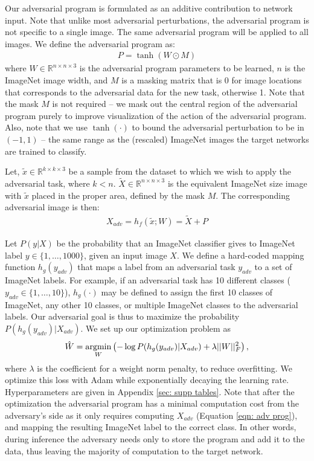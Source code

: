 \documentclass{article}
\newcommand{\argmin}{\operatornamewithlimits{argmin}}
\newcommand{\jcom}[1]{{\textcolor{darkgreen}{[Jascha: #1]}}}
\begin{document}
Our adversarial program is formulated as an additive contribution to network input. 
Note that unlike most adversarial perturbations, the adversarial program is not specific to a single image. 
The same adversarial program will be applied to all images.
We define the adversarial program as:
\begin{align}
P = \tanh\left(W \odot M\right)
\end{align}
where $W \in \mathbb{R}^{n \times n \times 3}$ is the adversarial program parameters to be learned, $n$ is the ImageNet image width, and $M$ is a masking matrix that is 0 for image locations that corresponds to the adversarial data for the new task, otherwise 1. 
Note that the mask $M$ is not required -- we mask out the central region of the adversarial program purely to improve visualization of the action of the adversarial program. 
Also, note that we use $\tanh\left(\cdot\right)$ to bound the adversarial perturbation to be in $(-1, 1)$ -- the same range as the (rescaled) ImageNet images the target networks are trained to classify. 

Let, $\tilde{x} \in \mathbb{R}^{k \times k \times 3}$ be a sample from the dataset to which we wish to apply the adversarial task, where $k < n$. $\tilde{X} \in \mathbb{R}^{n \times n \times 3}$ is the equivalent ImageNet size image with $\tilde{x}$ placed in the proper area, defined by the mask $M$.
The corresponding adversarial image is then:
\begin{align}
X_{adv} = h_f\left(\tilde{x}; W\right) = 
\tilde{X} + P
\label{eqn: adv prog}
\end{align}%

Let $P(y | X)$ be the probability that an ImageNet classifier gives to ImageNet label $y \in \{1, \hdots, 1000\}$, given an input image $X$. We define a hard-coded mapping function $h_g(y_{adv})$ that maps a label from an adversarial task $y_{adv}$ to a set of ImageNet labels. For example, if an adversarial task has 10 different classes ($y_{adv} \in \{1, \hdots, 10\}$), $h_g\left(\cdot\right)$ may be defined to assign the first 10 classes of ImageNet, any other 10 classes, or multiple ImageNet classes to the adversarial labels. Our adversarial goal is thus to maximize the probability $P(h_g(y_{adv}) | X_{adv})$. We set up our optimization problem as
\begin{align}
\label{eq adv obj}
\hat{W} = 
\argmin_{W} \left( 
	- \log P(h_g(y_{adv}) | X_{adv}) + \lambda ||W||_F^2
	\right)
,
\end{align}
where $\lambda$ is the coefficient for a weight norm penalty, to reduce overfitting.
We optimize this loss with Adam while exponentially decaying the learning rate. Hyperparameters 
are given in Appendix \ref{sec: supp tables}.
Note that after the optimization the adversarial program has a minimal computation cost from the adversary's side as it only requires computing $X_{adv}$ (Equation \ref{eqn: adv prog}), and mapping the resulting ImageNet label to the correct class. 
In other words, during inference the adversary needs only to store the program and add it to the data, thus leaving the majority of computation to the target network. 
\end{document}
